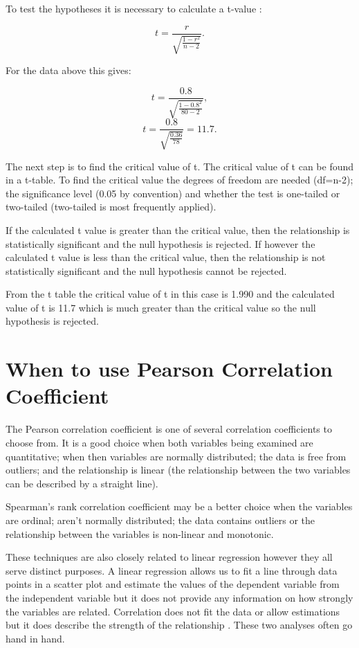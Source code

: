 \documentclass[
]{book}
\begin{document}
To test the hypotheses it is necessary to calculate a t-value \citep{swinscow2}:

\[t=\frac{r}{\sqrt{\frac{1-r^2}{n-2}}}.\]

For the data above this gives:

\[t=\frac{0.8}{\sqrt{\frac{1-0.8^2}{80-2}}},\]
\[t=\frac{0.8}{\sqrt{\frac{0.36}{78}}}= 11.7.\]

The next step is to find the critical value of t. The critical value of t can be found in a t-table. To find the critical value the degrees of freedom are needed (df=n-2); the significance level (0.05 by convention) and whether the test is one-tailed or two-tailed (two-tailed is most frequently applied).

If the calculated t value is greater than the critical value, then the relationship is statistically significant and the null hypothesis is rejected. If however the calculated t value is less than the critical value, then the relationship is not statistically significant and the null hypothesis cannot be rejected.

From the t table the critical value of t in this case is 1.990 and the calculated value of t is 11.7 which is much greater than the critical value so the null hypothesis is rejected.

\hypertarget{when-to-use-pearson-correlation-coefficient}{%
\section{When to use Pearson Correlation Coefficient}\label{when-to-use-pearson-correlation-coefficient}}

The Pearson correlation coefficient is one of several correlation coefficients to choose from. It is a good choice when both variables being examined are quantitative; when then variables are normally distributed; the data is free from outliers; and the relationship is linear (the relationship between the two variables can be described by a straight line).

Spearman's rank correlation coefficient may be a better choice when the variables are ordinal; aren't normally distributed; the data contains outliers or the relationship between the variables is non-linear and monotonic.

These techniques are also closely related to linear regression however they all serve distinct purposes. A linear regression allows us to fit a line through data points in a scatter plot and estimate the values of the dependent variable from the independent variable but it does not provide any information on how strongly the variables are related. Correlation does not fit the data or allow estimations but it does describe the strength of the relationship \citep{schober}. These two analyses often go hand in hand.
\end{document}
